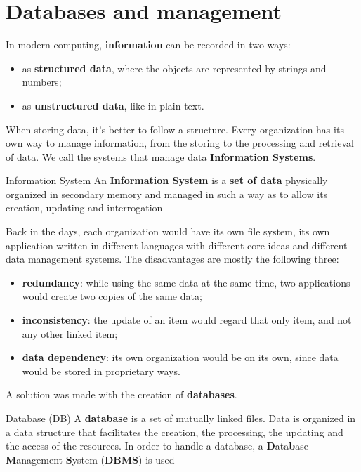\chapter{Databases and management}
In modern computing, \textbf{information} can be recorded in two ways:
\begin{itemize}
    \item as \textbf{structured data}, where the objects are represented by strings and numbers;
    \item as \textbf{unstructured data}, like in plain text.
\end{itemize}

When storing data, it's better to follow a structure. Every organization has its own way to manage information, from the storing to the processing and retrieval of data. We call the systems that manage data \textbf{Information Systems}.

\begin{definition}{Information System}
    An \textbf{Information System} is a \textbf{set of data} physically organized in secondary memory and managed in such a way as to allow its creation, updating and interrogation
\end{definition}

Back in the days, each organization would have its own file system, its own application written in different languages with different core ideas and different data management systems. The disadvantages are mostly the following three:
\begin{itemize}
    \item \textbf{redundancy}: while using the same data at the same time, two applications would create two copies of the same data;
    \item \textbf{inconsistency}: the update of an item would regard that only item, and not any other linked item;
    \item \textbf{data dependency}: its own organization would be on its own, since data would be stored in proprietary ways.
\end{itemize}

A solution was made with the creation of \textbf{databases}.

\begin{definition}{Database (DB)}
    A \textbf{database} is a set of mutually linked files. Data is organized in a data structure that facilitates the creation, the processing, the updating and the access of the resources. In order to handle a database, a \textbf{D}ata\textbf{b}ase \textbf{M}anagement \textbf{S}ystem (\textbf{DBMS}) is used
\end{definition}

